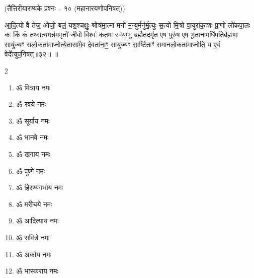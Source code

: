 \centerline{\normalsize (तैत्तिरीयारण्यके प्रश्नः – १० (महानारयणोपनिषत्))}
आ॒दि॒त्यो वै तेज॒ ओजो॒ बलं॒ यश॒श्चक्षुः॒ श्रोत्र॑मा॒त्मा मनो॑ म॒न्युर्मनु॑र्मृ॒त्युः स॒त्यो मि॒त्रो वा॒युरा॑का॒शः प्रा॒णो लो॑कपा॒लः कः किं कं तथ्स॒त्यमन्न॑म॒मृतो॑ जी॒वो विश्वः॑ कत॒मः स्व॑य॒म्भु ब्रह्मै॒तदमृ॑त ए॒ष पुरु॑ष ए॒ष भू॒ताना॒मधि॑पति॒र्ब्रह्म॑णः॒ सायु॑ज्यꣳ सलो॒कता॑माप्नोत्ये॒तासा॑मे॒व दे॒वता॑ना॒ꣳ॒ सायु॑ज्यꣳ सा॒र्ष्टिताꣳ॑ समानलो॒कता॑माप्नोति॒ य ए॒वं वेदे᳚त्युप॒निषत्॥३२॥
\devAya{}॥

\begingroup
\setlength{\parindent}{1.5em}
\makeatletter
  \def\vhrulefill#1{\leavevmode\leaders\hrule\@height#1\hfill \kern\z@}
\makeatother
\newcommand{\anuvakamend}[1][]{\refstepcounter{anuvakam}%
\newline\centerline{\devAya{}।}
\centerline{\textbf{ॐ नमो नारायणाय॥}}
\newline\mbox{}
\baselineskip=12pt\nolinebreak[4]\vhrulefill{1.6pt}\raisebox{-3pt}{\bfseries{[\devanumber{\arabic{anuvakam}}]}}%
\vspace{-1pt}
}
\setlength{\emergencystretch}{3em}
\renewcommand{\sect}[1]{}
\newcommand{\ip}{}
\newcommand{\prashnaend}[2]{}

\endgroup
\begingroup
\let\chapt\sect

\endgroup


\begin{multicols}{2}
\begin{enumerate}
\item ॐ मित्राय नमः
\item ॐ रवये नमः
\item ॐ सूर्याय नमः
\item ॐ भानवे नमः
\item ॐ खगाय नमः
\item ॐ पूष्णे नमः
\item ॐ हिरण्यगर्भाय नमः
\item ॐ मरीचये नमः
\item ॐ आदित्याय नमः
\item ॐ सवित्रे नमः
\item ॐ अर्काय नमः
\item ॐ भास्कराय नमः

\end{enumerate}
\end{multicols}

\begingroup
\setlength{\columnseprule}{1pt}
\let\chapt\sect
\begin{center}

\end{center}
\endgroup

